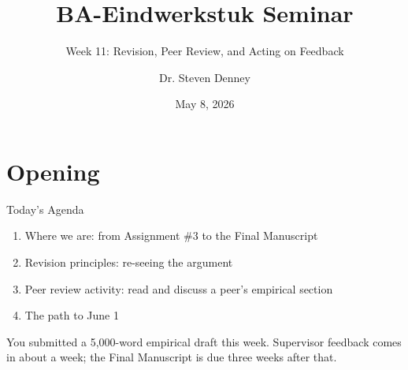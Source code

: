 \documentclass[aspectratio=169,11pt]{beamer}
\title{BA-Eindwerkstuk Seminar}
\subtitle{Week 11: Revision, Peer Review, and Acting on Feedback}
\author{Dr. Steven Denney}
\institute{Korean Studies \\ Leiden University}
\date{May 8, 2026}
\begin{document}
\begin{frame}
    \titlepage
\end{frame}

\section{Opening}

\begin{frame}{Today's Agenda}
    \begin{enumerate}
        \item Where we are: from Assignment \#3 to the Final Manuscript
        \item Revision principles: re-seeing the argument
        \item Peer review activity: read and discuss a peer's empirical section
        \item The path to June 1
    \end{enumerate}
    \vspace{0.5cm}

    You submitted a 5{,}000-word empirical draft this week. Supervisor feedback comes in about a week; the Final Manuscript is due three weeks after that.
\end{frame}
\end{document}
